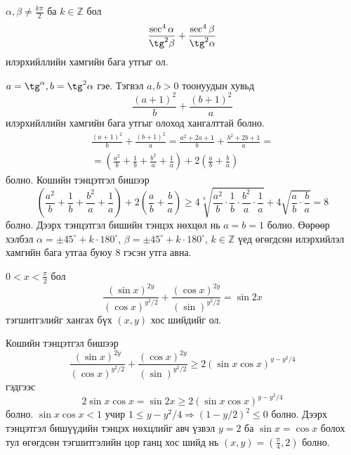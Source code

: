 \documentclass[10pt,a4paper,oneside]{book}
\begin{document}
\Problem
$\alpha, \beta \neq \frac{k\pi}{2}$ ба $k \in \mathbb{Z}$ бол
\begin{equation*}
\frac{\sec^4 \alpha}{\tg^2 \beta} + \frac{\sec^4 \beta}{\tg^2 \alpha}
\end{equation*}
илэрхийллийн хамгийн бага утгыг ол.

\TheSolution
$a=\tg^ \alpha, b = \tg^2 \alpha$ гэе. Тэгвэл $a, b > 0$ тоонуудын хувьд
\begin{equation*}
\frac{(a+1)^2}{b} + \frac{(b+1)^2}{a}
\end{equation*}
илэрхийллийн хамгийн бага утгыг олоход хангалттай болно.
\begin{align*}
\frac{(a+1)^2}{b} + \frac{(b+1)^2}{a} = \frac{a^2+2a+1}{b} + \frac{b^2 + 2b + 1}{a} = \\
 = \left(\frac{a^2}{b} + \frac{1}{b} + \frac{b^2}{a} + \frac{1}{a}\right) + 2\left(\frac{a}{b} + \frac{b}{a}\right)
\end{align*}
болно. Кошийн тэнцэтгэл бишээр
\begin{equation*}
\left(\frac{a^2}{b} + \frac{1}{b} + \frac{b^2}{a} + \frac{1}{a}\right) + 2\left(\frac{a}{b} + \frac{b}{a}\right) \geq
4\sqrt[4]{\frac{a^2}{b}\cdot \frac{1}{b}\cdot\frac{b^2}{a}\cdot \frac{1}{a}} + 4\sqrt{\frac{a}{b}\cdot \frac{b}{a}} = 8
\end{equation*}
болно. Дээрх тэнцэтгэл бишийн тэнцэх нөхцөл нь $a=b = 1$ болно. Өөрөөр хэлбэл $\alpha = \pm 45^\circ + k\cdot 180^\circ$, $\beta = \pm 45^\circ + k\cdot 180^\circ$, $k \in \mathbb{Z}$ үед өгөгдсөн илэрхийлэл хамгийн бага утгаа буюу $8$ гэсэн утга авна.

\Problem
$0<x<\frac{\pi}{2}$ бол
\begin{equation*}
\frac{(\sin x)^{2y}}{(\cos x)^{y^2/2}} + \frac{(\cos x)^{2y}}{(\sin)^{y^2/2}} = \sin 2x
\end{equation*}
тэгшитгэлийг хангах бүх $(x, y)$ хос шийдийг ол.

\TheSolution
Кошийн тэнцэтгэл бишээр
\begin{equation*}
\frac{(\sin x)^{2y}}{(\cos x)^{y^2/2}} + \frac{(\cos x)^{2y}}{(\sin)^{y^2/2}} \geq 2(\sin x\cos x)^{y-y^2/4}
\end{equation*}
гэдгээс
\begin{equation*}
2\sin x\cos x = \sin 2x \geq 2(\sin x\cos x)^{y-y^2/4}
\end{equation*}
болно. $\sin x\cos x < 1$ учир $1 \leq y - y^2/4 \Rightarrow (1-y/2)^2 \leq 0$ болно. Дээрх тэнцэтгэл бишүүдийн тэнцэх нөхцлийг авч үзвэл $y =2$ ба $\sin x = \cos x$ болох тул өгөгдсөн тэгшитгэлийн цор ганц хос шийд нь $(x, y) = \left(\frac{\pi}{4}, 2\right)$ болно.
\end{document}
